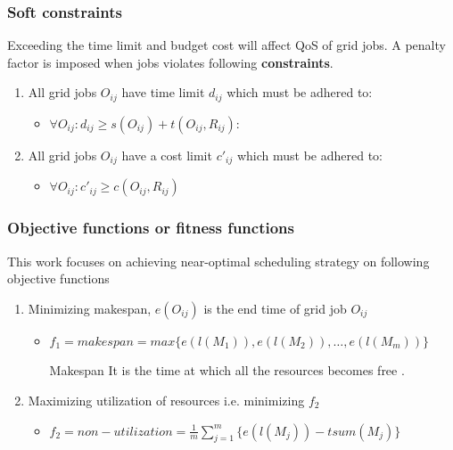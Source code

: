 \documentclass{beamer}
\begin{document}
\begin{frame}
\frametitle{Soft constraints}
Exceeding the time limit and budget cost will affect QoS of grid jobs. A penalty factor is imposed when jobs violates following \textbf{constraints}.
\begin{enumerate}
  \item All grid jobs $O_{ij}$ have time limit $d_{ij}$ which must be adhered to:
  \begin{itemize}
   \item $ \forall O_{ij} : d_{ij} \geq s(O_{ij}) + t(O_{ij},R_{ij}) $:
  \end{itemize}
  \item All grid jobs $O_{ij}$ have a cost limit  $c'_{ij}$ which must be adhered to: 
  \begin{itemize}
   \item $\forall O_{ij} : c'_{ij} \geq c(O_{ij},R_{ij}) $
  \end{itemize}
\end{enumerate}
\end{frame}

\begin{frame}[label=mkspn1]
\frametitle{Objective functions or fitness functions}
This work focuses on achieving near-optimal scheduling strategy on following objective functions
\begin{enumerate}
  \setcounter{enumi}{0}
  \item Minimizing makespan, $e(O_{ij})$ is the end time of grid job $O_{ij}$
  \begin{itemize}
   \item $ f_1 =makespan = max\{e(l(M_1)),e(l(M_2)),\ldots,e(l(M_m)) \}$
      \begin{block}
      {Makespan} It is the time at which all the resources becomes free \hyperlink{supplement1}{}.
      \end{block}
  \end{itemize}
  \item Maximizing utilization of resources i.e. minimizing $f_2$
  \begin{itemize}
  \item $ f_2 = non-utilization = \frac{1}{m} \sum_{j=1}^{m}  \{e(l(M_j)) - tsum (M_j)\}$
  \end{itemize}
\end{enumerate}
\end{frame}
\end{document}
